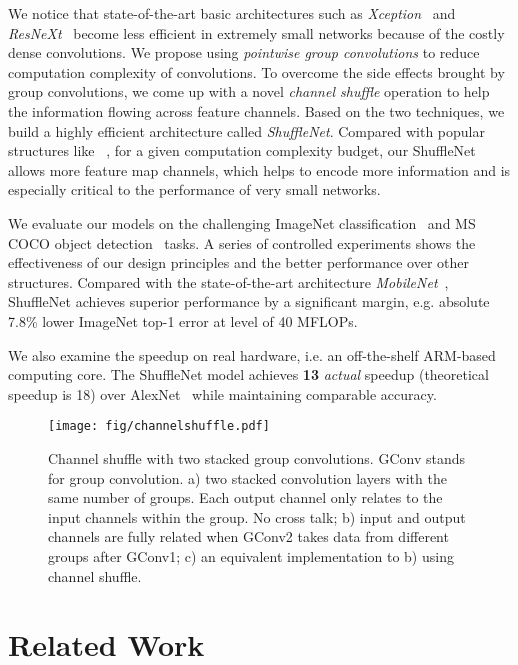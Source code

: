 \documentclass[10pt,twocolumn,letterpaper]{article}
\begin{document}
We notice that state-of-the-art basic architectures such as \emph{Xception}~\cite{chollet2016xception} and \emph{ResNeXt}~\cite{xie2016aggregated} become less efficient in extremely small networks because of the costly dense  convolutions. We propose using \emph{pointwise group convolutions} to reduce computation complexity of  convolutions. To overcome the side effects brought by group convolutions, we come up with a novel \emph{channel shuffle} operation to help the information flowing across feature channels. Based on the two techniques, we build a highly efficient architecture called \emph{ShuffleNet}. Compared with popular structures like ~\cite{simonyan2014very,he2016deep,xie2016aggregated}, for a given computation complexity budget, our ShuffleNet allows more feature map channels, which helps to encode more information and is especially critical to the performance of very small networks.

We evaluate our models on the challenging ImageNet classification~\cite{deng2009imagenet,russakovsky2015imagenet} and MS COCO object detection~\cite{lin2014microsoft} tasks. A series of controlled experiments shows the effectiveness of our design principles and the better performance over other structures. Compared with the state-of-the-art architecture \emph{MobileNet}~\cite{howard2017mobilenets}, ShuffleNet achieves superior performance by a significant margin, e.g. absolute 7.8\% lower ImageNet top-1 error at level of 40 MFLOPs. 

We also examine the speedup on real hardware, i.e. an off-the-shelf ARM-based computing core. The ShuffleNet model achieves \textbf{13} \emph{actual} speedup (theoretical speedup is 18) over AlexNet~\cite{krizhevsky2012imagenet} while maintaining comparable accuracy.

\begin{figure*}[ht]
	\centering
	\texttt{[image: fig/channelshuffle.pdf]}
	\caption{Channel shuffle with two stacked group convolutions. GConv stands for group convolution. a) two stacked convolution layers with the same number of groups. Each output channel only relates to the input channels within the group. No cross talk; b) input and output channels are fully related when GConv2 takes data from different groups after GConv1; c) an equivalent implementation to b) using channel shuffle.}
	\label{fig:channelshuffle}
\end{figure*}

\section{Related Work}
\end{document}
